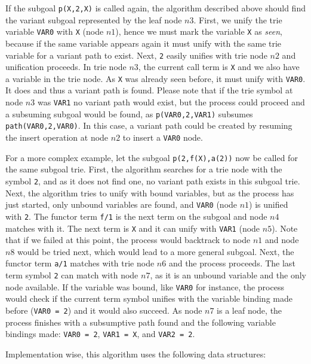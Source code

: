If the subgoal \texttt{p(X,2,X)} is called again, the algorithm described above
should find the variant subgoal represented by the leaf node $n3$. First, we unify the trie variable
\texttt{VAR0} with \texttt{X} (node $n1$), hence we must mark the variable \texttt{X} as \textit{seen},
because if the same variable appears again it must unify with the same trie variable for a variant path
to exist. Next, \texttt{2} easily unifies with trie node $n2$ and unification proceeds. In trie node $n3$,
the current call term is \texttt{X} and we also have a variable in the trie node. As \texttt{X} was already seen before,
it must unify with \texttt{VAR0}. It does and thus a variant path is found. Please note that if
the trie symbol at node $n3$ was \texttt{VAR1} no variant path would exist, but the process could proceed
and a subsuming subgoal would be found, as \texttt{p(VAR0,2,VAR1)} subsumes \texttt{path(VAR0,2,VAR0)}.
In this case, a variant path could be created by resuming the insert operation at node $n2$ to insert
a \texttt{VAR0} node.

For a more complex example, let the subgoal \texttt{p(2,f(X),a(2))} now be called for the same subgoal trie. First,
the algorithm searches for a trie node with the symbol \texttt{2}, and as it does not find one, no variant path
exists in this subgoal trie. Next, the algorithm tries to unify with bound variables, but as the process
has just started, only unbound variables are found, and \texttt{VAR0} (node $n1$) is unified with \texttt{2}.
The functor term \texttt{f/1} is the next term on the subgoal and node $n4$ matches with it.
The next term is \texttt{X} and it can unify with \texttt{VAR1} (node $n5$).
Note that if we failed at this point, the process would backtrack to node $n1$ and node $n8$
would be tried next, which would lead to a more general subgoal.
Next, the functor term \texttt{a/1} matches with trie node $n6$ and the process proceeds.
The last term symbol \texttt{2} can match with node $n7$, as it is an unbound variable
and the only node available.
If the variable was bound, like \texttt{VAR0} for instance,
the process would check if the current term symbol unifies with the variable binding made before (\texttt{VAR0~=~2}) and
it would also succeed. As node $n7$ is a leaf node, the process finishes with a subsumptive path found and
the following variable bindings made: \texttt{VAR0~=~2}, \texttt{VAR1~=~X}, and \texttt{VAR2~=~2}.

Implementation wise, this algorithm uses the following data structures:

